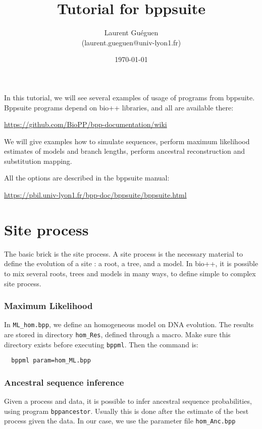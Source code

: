 \documentclass{article}
\title{Tutorial for bppsuite}
\date{\today}
\author{Laurent Guéguen \\ {\small (laurent.gueguen@univ-lyon1.fr)}}
\begin{document}
\maketitle
\thispagestyle{empty}

\medskip 


In this tutorial, we will see several examples of usage of programs
from bppsuite. Bppsuite programs depend on bio++ libraries, and all
are available there:

\url{https://github.com/BioPP/bpp-documentation/wiki}

\medskip

We will give examples how to simulate sequences, perform maximum
likelihood estimates of models and branch lengths, perform ancestral
reconstruction and substitution mapping.

All the options are described in the bppsuite manual:

\url{https://pbil.univ-lyon1.fr/bpp-doc/bppsuite/bppsuite.html}


\medskip


\section{Site process}

The basic brick is the site process. A site process is the necessary
material to define the evolution of a site : a root, a tree, and a
model. In bio++, it is possible to mix several roots, trees and models
in many ways, to define simple to complex site process.


\subsubsection*{Maximum Likelihood}

In \texttt{ML\_hom.bpp}, we define an homogeneous model on DNA evolution.
The results are stored in directory \texttt{hom\_Res}, defined through
a macro. Make sure this directory exists before executing
\texttt{bppml}. Then the command is:

\begin{verbatim}
  bppml param=hom_ML.bpp
\end{verbatim}

\subsubsection*{Ancestral sequence inference}

Given a process and data, it is possible to infer ancestral sequence
probabilities, using program \texttt{bppancestor}. Usually this is
done after the estimate of the best process given the data. In our
case, we use the parameter file \texttt{hom\_Anc.bpp}
\end{document}
